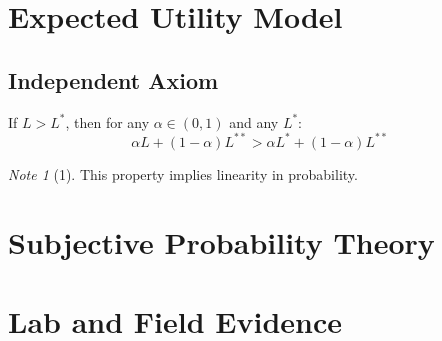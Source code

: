 \documentclass{book}
\theoremstyle{plain}
\theoremstyle{definition}
\theoremstyle{remark}
\newtheorem*{note}{Note}
\begin{document}
\section{Expected Utility Model}
\subsection{Independent Axiom}
If $L>L^{*}$, then for any $\alpha \in (0,1)$ and any $L^{*}$:
\begin{equation}
	\alpha L + (1-\alpha) L^{**} > \alpha L^{*} + (1-\alpha) L^{**}
\end{equation}

\begin{note}[1]
This property implies linearity in probability.
\end{note}
\section{Subjective Probability Theory}
\section{Lab and Field Evidence}
\end{document}
